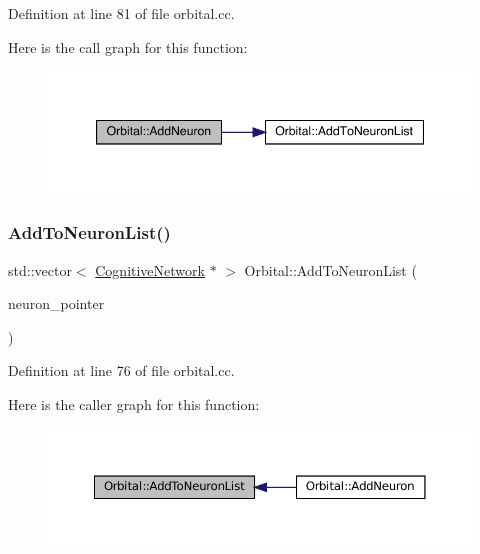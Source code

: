 Definition at line 81 of file orbital.\+cc.

Here is the call graph for this function\+:\nopagebreak
\begin{figure}[H]
\begin{center}
\leavevmode
\includegraphics[width=347pt]{class_orbital_a57480cdd63dd1bf731864f513767800d_cgraph}
\end{center}
\end{figure}
\mbox{\label{class_orbital_a44230cebc40357d186c442bfac2507a4}} 
\subsubsection{\texorpdfstring{Add\+To\+Neuron\+List()}{AddToNeuronList()}}
{\footnotesize\ttfamily std\+::vector$<$ \mbox{\hyperlink{class_cognitive_network}{Cognitive\+Network}} $\ast$ $>$ Orbital\+::\+Add\+To\+Neuron\+List (\begin{DoxyParamCaption}\item[{\mbox{\hyperlink{class_cognitive_network}{Cognitive\+Network}} $\ast$}]{neuron\+\_\+pointer }\end{DoxyParamCaption})}



Definition at line 76 of file orbital.\+cc.

Here is the caller graph for this function\+:\nopagebreak
\begin{figure}[H]
\begin{center}
\leavevmode
\includegraphics[width=350pt]{class_orbital_a44230cebc40357d186c442bfac2507a4_icgraph}
\end{center}
\end{figure}
\mbox{\label{class_orbital_a5aa5edbae517ff393fc1eb0ae2422123}} 
